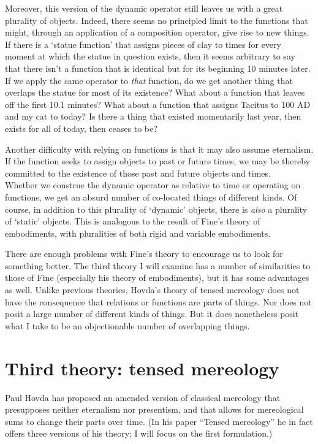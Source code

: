 \documentclass[11pt]{article}
\begin{document}
\begin{spacing}{1.5}
Moreover, this version of the dynamic operator still leaves us with a
great plurality of objects.  Indeed, there seems no principled limit
to the functions that might, through an application of a composition
operator, give rise to new things.  If there is a `statue function'
that assigns pieces of clay to times for every moment at which the
statue in question exists, then it seems arbitrary to say that there
isn't a function that is identical but for its beginning 10 minutes
later.  If we apply the same operator to {\em that} function, do we
get another thing that overlaps the statue for most of its existence?
What about a function that leaves off the first 10.1 minutes?  What
about a function that assigns Tacitus to 100 AD and my cat to today?
Is there a thing that existed momentarily last year, then exists for
all of today, then ceases to be?

Another difficulty with relying on functions is that it may also
assume eternalism.  If the function seeks to assign objects to past or
future times, we may be thereby committed to the existence of those
past and future objects and times.\\

Whether we construe the dynamic operator as relative to time or
operating on functions, we get an absurd number of co-located things
of different kinds.  Of course, in addition to this plurality of
`dynamic' objects, there is {\em also} a plurality of `static'
objects.  This is analogous to the result of Fine's theory of
embodiments, with pluralities of both rigid and variable embodiments.

There are enough problems with Fine's theory to encourage us to look
for something better.  The third theory I will examine has a number of
similarities to those of Fine (especially his theory of embodiments),
but it has some advantages as well.  Unlike previous theories, Hovda's
theory of tensed mereology does not have the consequence that
relations or functions are parts of things.  Nor does not posit a
large number of different kinds of things.  But it does nonetheless
posit what I take to be an objectionable number of overlapping things.

\section{Third theory: tensed mereology}
\label{hovda}
Paul Hovda has proposed an amended version of classical mereology that
presupposes neither eternalism nor presentism, and that allows for
mereological sums to change their parts over time.  (In his paper
``Tensed mereology'' \citeyearpar{hovda2011} he in fact offers three
versions of his theory; I will focus on the first formulation.)


\end{spacing}
\end{document}
